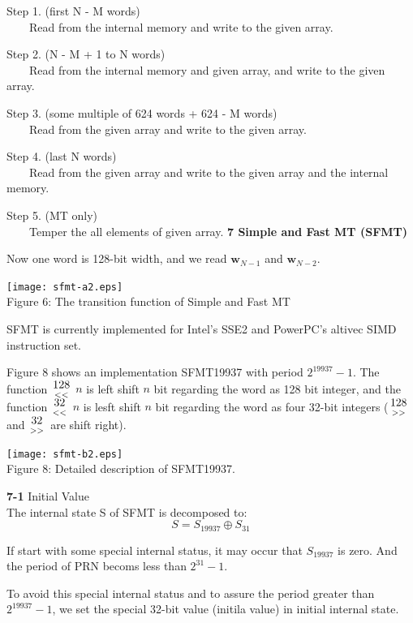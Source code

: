 \documentclass[a4j,12pt,landscape]{jarticle}
\def\bw{{{\mathbf w}}}
\newcommand{\lshift}[1]{{\large $\mbox{#1}\atop<<$}}
\newcommand{\rshift}[1]{{\large $\mbox{#1}\atop >>$}}
\begin{document}
Step 1. (first N - M words) \\
~~~~Read from the internal memory and write to the given array.

Step 2. (N - M + 1 to N words) \\
~~~~Read from the internal memory and given array, and 
write to the given array.

Step 3. (some multiple of 624 words + 624 - M words)\\
~~~~Read from the given array and write to the given array.

Step 4. (last N words)\\
~~~~Read from the given array and write to the given array and
 the internal memory.

Step 5. (MT only)\\
~~~~Temper the all elements of given array. 
\newpage
\noindent
{\bf 7 Simple and Fast MT (SFMT)}

Now one word is 128-bit width,
and we read $\bw_{N-1}$ and $\bw_{N-2}$.

\begin{center}
\texttt{[image: sfmt-a2.eps]}
\\
Figure 6: The transition function of Simple and Fast MT
\end{center}
SFMT is currently implemented for Intel's SSE2 and PowerPC's altivec SIMD
instruction set.


\newpage
Figure 8 shows an implementation SFMT19937 with period
$2^{19937}-1$.  The function \lshift{128} $n$ is left shift $n$ bit
regarding the word as 128 bit integer, and the function \lshift{32} $n$ is
lesft shift $n$ bit regarding the word as four 32-bit integers
(\rshift{128} and \rshift{32} are shift right).

\begin{center}
\texttt{[image: sfmt-b2.eps]}
\\
Figure 8: Detailed description of SFMT19937.
\end{center}

\newpage
{\bf 7-1} Initial Value\\
The internal state S of SFMT is decomposed to:
$$
S = S_{19937} \oplus S_{31}
$$

If start with some special internal status,
it may occur that $S_{19937}$ is zero.
And the period of PRN becoms less than $2^{31}-1$.

To avoid this special internal status and to assure
the period greater than $2^{19937}-1$,
we set the special 32-bit value (initila value) in 
initial internal state.
\end{document}
